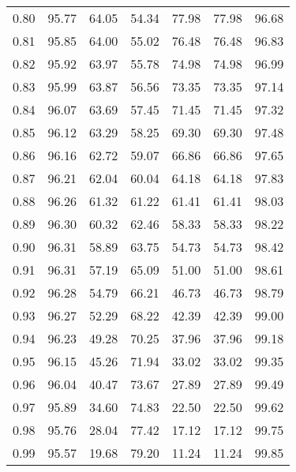 \begin{tabular}{|c|c|c|c|c|c|c|}
      0.80 &     95.77 &     64.05 &      54.34 &   77.98 &      77.98 &         96.68 \\
      0.81 &     95.85 &     64.00 &      55.02 &   76.48 &      76.48 &         96.83 \\
      0.82 &     95.92 &     63.97 &      55.78 &   74.98 &      74.98 &         96.99 \\
      0.83 &     95.99 &     63.87 &      56.56 &   73.35 &      73.35 &         97.14 \\
      0.84 &     96.07 &     63.69 &      57.45 &   71.45 &      71.45 &         97.32 \\
      0.85 &     96.12 &     63.29 &      58.25 &   69.30 &      69.30 &         97.48 \\
      0.86 &     96.16 &     62.72 &      59.07 &   66.86 &      66.86 &         97.65 \\
      0.87 &     96.21 &     62.04 &      60.04 &   64.18 &      64.18 &         97.83 \\
      0.88 &     96.26 &     61.32 &      61.22 &   61.41 &      61.41 &         98.03 \\
      0.89 &     96.30 &     60.32 &      62.46 &   58.33 &      58.33 &         98.22 \\
      0.90 &     96.31 &     58.89 &      63.75 &   54.73 &      54.73 &         98.42 \\
      0.91 &     96.31 &     57.19 &      65.09 &   51.00 &      51.00 &         98.61 \\
      0.92 &     96.28 &     54.79 &      66.21 &   46.73 &      46.73 &         98.79 \\
      0.93 &     96.27 &     52.29 &      68.22 &   42.39 &      42.39 &         99.00 \\
      0.94 &     96.23 &     49.28 &      70.25 &   37.96 &      37.96 &         99.18 \\
      0.95 &     96.15 &     45.26 &      71.94 &   33.02 &      33.02 &         99.35 \\
      0.96 &     96.04 &     40.47 &      73.67 &   27.89 &      27.89 &         99.49 \\
      0.97 &     95.89 &     34.60 &      74.83 &   22.50 &      22.50 &         99.62 \\
      0.98 &     95.76 &     28.04 &      77.42 &   17.12 &      17.12 &         99.75 \\
      0.99 &     95.57 &     19.68 &      79.20 &   11.24 &      11.24 &         99.85 \\
\bottomrule
\end{tabular}
